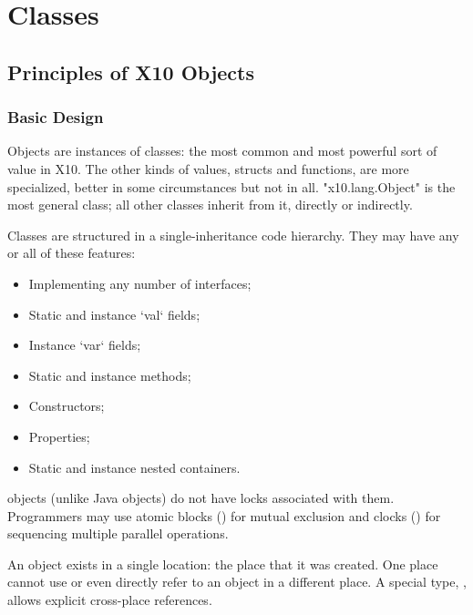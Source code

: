 \chapter{Classes}
\label{XtenClasses}
\label{ReferenceClasses}

\section{Principles of X10 Objects}\label{XtenObjects}

\subsection{Basic Design}

Objects are instances of classes: the most common and most powerful sort of
value in X10.  The other kinds of values, structs and functions, are more
specialized, better in some circumstances but not in all.
\xcd"x10.lang.Object" is the most general class; all other classes inherit
from it, directly or indirectly. 


Classes are structured in a single-inheritance code
hierarchy.   They may have any or all of these features: 
\begin{itemize}
\item Implementing any number of interfaces;
\item Static and instance \xcd`val` fields; 
\item Instance \xcd`var` fields; 
\item Static and instance methods;
\item Constructors;
\item Properties;
\item Static and instance nested containers.
\end{itemize}


\Xten{} objects (unlike Java objects) do not have locks associated with them.
Programmers may use atomic blocks () for mutual
exclusion and clocks () for sequencing multiple parallel
operations.

An object exists in a single location: the place that it was created.  One
place cannot use or even directly refer to an object in a different place.   A
special type, , allows explicit cross-place references. 

